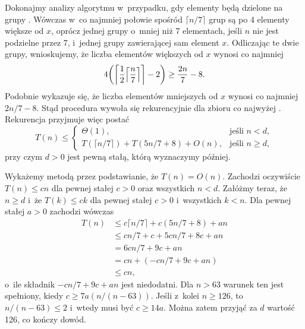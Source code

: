 
\exercise %
Dokonajmy analizy algorytmu  w~przypadku, gdy elementy będą dzielone na grupy .
Wówczas w~co najmniej połowie spośród $\lceil n/7\rceil$ grup są po 4 elementy większe od $x$, oprócz jednej grupy o~mniej niż 7 elementach, jeśli $n$ nie jest podzielne przez 7, i~jednej grupy zawierającej sam element $x$.
Odliczając te dwie grupy, wnioskujemy, że liczba elementów większych od $x$ wynosi co najmniej
\[
	4\biggl(\biggl\lceil\frac{1}{2}\Bigl\lceil\frac{n}{7}\Bigr\rceil\biggr\rceil-2\biggr) \ge \frac{2n}{7}-8.
\]
Podobnie wykazuje się, że liczba elementów mniejszych od $x$ wynosi co najmniej $2n/7-8$.
Stąd procedura wywoła się rekurencyjnie dla zbioru co najwyżej .
Rekurencja przyjmuje więc postać
\[
	T(n) \le \begin{cases}
		\Theta(1), & \text{jeśli $n<d$}, \\
		T(\lceil n/7\rceil)+T(5n/7+8)+O(n), & \text{jeśli $n\ge d$},
	\end{cases}
\]
przy czym $d>0$ jest pewną stałą, którą wyznaczymy później.

Wykażemy metodą przez podstawianie, że $T(n)=O(n)$.
Zachodzi oczywiście $T(n)\le cn$ dla pewnej stałej $c>0$ oraz wszystkich $n<d$.
Załóżmy teraz, że $n\ge d$ i~że $T(k)\le ck$ dla pewnej stałej $c>0$ i~wszystkich $k<n$.
Dla pewnej stałej $a>0$ zachodzi wówczas
\begin{align*}
	T(n) &\le c\lceil n/7\rceil+c(5n/7+8)+an \\
	&\le cn/7+c+5cn/7+8c+an \\
	&= 6cn/7+9c+an \\
	&= cn+(-cn/7+9c+an) \\
	&\le cn,
\end{align*}
o~ile składnik $-cn/7+9c+an$ jest niedodatni.
Dla $n>63$ warunek ten jest spełniony, kiedy $c\ge7a(n/(n-63))$.
Jeśli z~kolei $n\ge126$, to $n/(n-63)\le2$ i~wtedy musi być $c\ge14a$.
Można zatem przyjąć za $d$ wartość 126, co kończy dowód.

